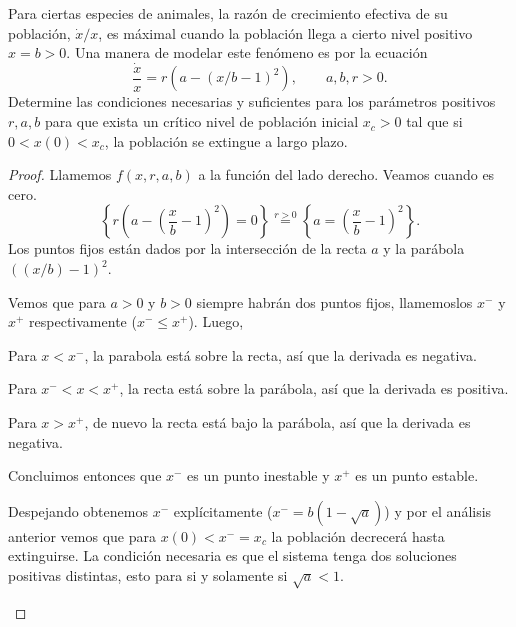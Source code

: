 \begin{problema}
Para ciertas especies de animales, la razón de crecimiento efectiva de su
población, \(\dot{x}/x\), es máximal cuando la población llega a cierto nivel
positivo \(x = b > 0\). Una manera de modelar este fenómeno es por la ecuación
\[
    \frac{\dot{x}}{x} = r\left(a - (x/b - 1)^2\right),
    \qquad a,b,r > 0
.\]
Determine las condiciones necesarias y suficientes para los parámetros positivos
\(r,a,b\) para que exista un crítico nivel de población inicial \(x_c > 0\) tal que
si \(0 < x(0) < x_c\), la población se extingue a largo plazo.
\end{problema}
\begin{proof}
Llamemos \(f(x,r,a,b)\) a la función del lado derecho. Veamos cuando es cero.
\[
    \left\{ r \left(a - \left(\frac{x}{b} -1\right)^2\right) = 0 \right\}
    \overset{r>0}{=}
    \left\{ a = \left(\frac{x}{b} - 1\right)^2 \right\}
.\]
Los puntos fijos están dados por la intersección de la recta \(a\) y la parábola
\(((x/b)-1)^2\).

%
{%
Vemos que para \(a>0\) y \(b>0\) siempre habrán dos puntos fijos, llamemoslos
\(x^{-}\) y \(x^{+}\) respectivamente (\(x^{-} \le x^{+}\)). Luego,
\begin{clist}
\item Para \(x < x^{-}\), la parabola está sobre la recta, así que la derivada
es negativa.
\item Para \(x^{-} < x < x^{+}\), la recta está sobre la parábola, así que la
derivada es positiva.
\item Para \(x > x^{+}\), de nuevo la recta está bajo la parábola, así que la
derivada es negativa.
\end{clist}
Concluimos entonces que \(x^{-}\) es un punto inestable y \(x^{+}\) es un punto
estable.

Despejando obtenemos \(x^{-}\) explícitamente (\(x^{-} = b(1-\sqrt{a})\)) y por
el análisis anterior vemos que para \(x(0) < x^{-} = x_c\) la población
decrecerá hasta extinguirse. La condición necesaria es que el sistema tenga dos
soluciones positivas distintas, esto para si y solamente si \(\sqrt{a} < 1\).
}%
{%
\begin{figure}[H]
\centering
{}
\end{figure}}
\end{proof}
